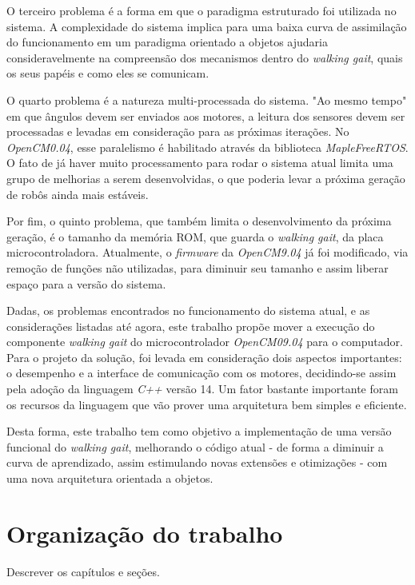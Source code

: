 O terceiro problema é a forma em que o paradigma estruturado foi utilizada no sistema. A complexidade do sistema implica para uma baixa curva de assimilação do funcionamento em um paradigma orientado a objetos ajudaria consideravelmente na compreensão dos mecanismos dentro do \textit{walking gait}, quais os seus papéis e como eles se comunicam.

O quarto problema é a natureza multi-processada do sistema. "Ao mesmo tempo" em que ângulos devem ser enviados aos motores, a leitura dos sensores devem ser processadas e levadas em consideração para as próximas iterações. No \textit{OpenCM0.04}, esse paralelismo é habilitado através da biblioteca \textit{MapleFreeRTOS}. O fato de já haver muito processamento para rodar o sistema atual limita uma grupo de melhorias a serem desenvolvidas, o que poderia levar a próxima geração de robôs ainda mais estáveis.

Por fim, o quinto problema, que também limita o desenvolvimento da próxima geração, é o tamanho da memória ROM, que guarda o \textit{walking gait}, da placa microcontroladora. Atualmente, o \textit{firmware} da \textit{OpenCM9.04} já foi modificado, via remoção de funções não utilizadas, para diminuir seu tamanho e  assim liberar espaço para a versão do sistema.

Dadas, os problemas encontrados no funcionamento do sistema atual, e as considerações listadas até agora, este trabalho propõe mover a execução do componente \textit{walking gait} do microcontrolador \textit{OpenCM09.04} para o computador. Para o projeto da solução, foi levada em consideração dois aspectos importantes: o desempenho e a interface de comunicação com os motores, decidindo-se assim pela adoção da linguagem \textit{C++} versão 14. Um fator bastante importante foram os recursos da linguagem que vão prover uma arquitetura bem simples e eficiente.

Desta forma, este trabalho tem como objetivo a implementação de uma versão funcional do \textit{walking gait}, melhorando o código atual - de forma a diminuir a curva de aprendizado, assim estimulando novas extensões e otimizações - com uma nova arquitetura orientada a objetos.

\section{Organização do trabalho}

Descrever os capítulos e seções.


